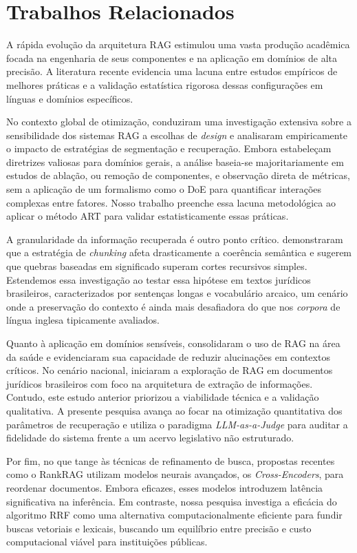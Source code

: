 \section{Trabalhos Relacionados}

A rápida evolução da arquitetura RAG estimulou uma vasta produção acadêmica focada na engenharia de seus componentes e na aplicação em domínios de alta precisão. A literatura recente evidencia uma lacuna entre estudos empíricos de melhores práticas e a validação estatística rigorosa dessas configurações em línguas e domínios específicos.

No contexto global de otimização, \citet{wang2024} conduziram uma investigação extensiva sobre a sensibilidade dos sistemas RAG a escolhas de \textit{design} e analisaram empiricamente o impacto de estratégias de segmentação e recuperação. Embora estabeleçam diretrizes valiosas para domínios gerais, a análise baseia-se majoritariamente em estudos de ablação, ou remoção de componentes, e observação direta de métricas, sem a aplicação de um formalismo como o DoE para quantificar interações complexas entre fatores. Nosso trabalho preenche essa lacuna metodológica ao aplicar o método ART para validar estatisticamente essas práticas.

A granularidade da informação recuperada é outro ponto crítico. \citet{thepowerofchunking} demonstraram que a estratégia de \textit{chunking} afeta drasticamente a coerência semântica e sugerem que quebras baseadas em significado superam cortes recursivos simples. Estendemos essa investigação ao testar essa hipótese em textos jurídicos brasileiros, caracterizados por sentenças longas e vocabulário arcaico, um cenário onde a preservação do contexto é ainda mais desafiadora do que nos \textit{corpora} de língua inglesa tipicamente avaliados.

Quanto à aplicação em domínios sensíveis, \citet{healthcare_rag} consolidaram o uso de RAG na área da saúde e evidenciaram sua capacidade de reduzir alucinações em contextos críticos. No cenário nacional, \citet{aquino2024} iniciaram a exploração de RAG em documentos jurídicos brasileiros com foco na arquitetura de extração de informações. Contudo, este estudo anterior priorizou a viabilidade técnica e a validação qualitativa. A presente pesquisa avança ao focar na otimização quantitativa dos parâmetros de recuperação e utiliza o paradigma \textit{LLM-as-a-Judge} para auditar a fidelidade do sistema frente a um acervo legislativo não estruturado.

Por fim, no que tange às técnicas de refinamento de busca, propostas recentes como o RankRAG \citep{rankrag} utilizam modelos neurais avançados, os \textit{Cross-Encoders}, para reordenar documentos. Embora eficazes, esses modelos introduzem latência significativa na inferência. Em contraste, nossa pesquisa investiga a eficácia do algoritmo RRF como uma alternativa computacionalmente eficiente para fundir buscas vetoriais e lexicais, buscando um equilíbrio entre precisão e custo computacional viável para instituições públicas.

